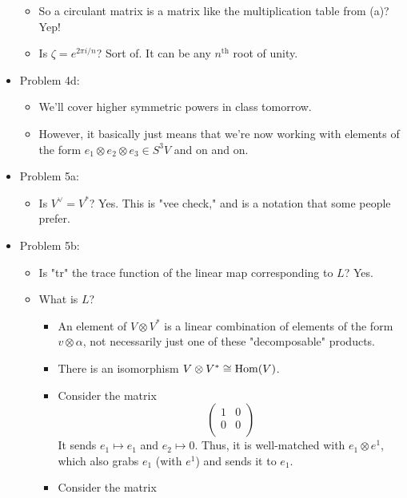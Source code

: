\documentclass[../notes.tex]{subfiles}
\begin{document}
\begin{itemize}
    \begin{itemize}
        \item So a circulant matrix is a matrix like the multiplication table from (a)? Yep!
        \item Is $\zeta=e^{2\pi i/n}$? Sort of. It can be any $n^\text{th}$ root of unity.
    \end{itemize}
    \item Problem 4d:
    \begin{itemize}
        \item We'll cover higher symmetric powers in class tomorrow.
        \item However, it basically just means that we're now working with elements of the form $e_1\otimes e_2\otimes e_3\in S^3V$ and on and on.
    \end{itemize}
    \item Problem 5a:
    \begin{itemize}
        \item Is $V^\vee=V^*$? Yes. This is "vee check," and is a notation that some people prefer.
    \end{itemize}
    \item Problem 5b:
    \begin{itemize}
        \item Is "tr" the trace function of the linear map corresponding to $L$? Yes.
        \item What is $L$?
        \begin{itemize}
            \item An element of $V\otimes V^*$ is a linear combination of elements of the form $v\otimes\alpha$, not necessarily just one of these "decomposable" products.
            \item There is an isomorphism $V\otimes V^*\cong\operatorname{Hom}(V)$.
            \item Consider the matrix
            \begin{equation*}
                \begin{pmatrix}
                    1 & 0\\
                    0 & 0\\
                \end{pmatrix}
            \end{equation*}
            It sends $e_1\mapsto e_1$ and $e_2\mapsto 0$. Thus, it is well-matched with $e_1\otimes e^1$, which also grabs $e_1$ (with $e^1$) and sends it to $e_1$.
            \item Consider the matrix

\end{itemize}
\end{itemize}
\end{itemize}
\end{document}
